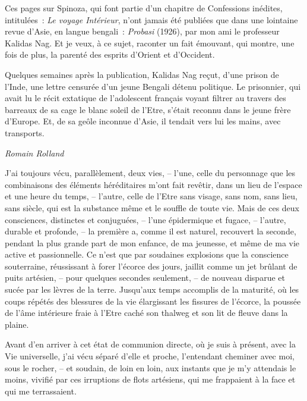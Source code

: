 

Ces pages sur Spinoza, qui font partie d'un chapitre de Confessions
inédites, intitulées~: \emph{Le voyage Intérieur}, n'ont jamais été
publiées que dans une lointaine revue d'Asie, en langue bengali~:
\emph{Probasi} (1926), par mon ami le professeur Kalidas Nag. Et je
veux, à ce sujet, raconter un fait émouvant, qui montre, une fois de
plus, la parenté des esprits d'Orient et d'Occident.

Quelques semaines après la publication, Kalidas Nag reçut, d'une prison
de l'Inde, une lettre censurée d'un jeune Bengali détenu politique. Le
prisonnier, qui avait lu le récit extatique de l'adolescent français
voyant filtrer au travers des barreaux de sa cage le blanc soleil de
l'Etre, s'était reconnu dans le jeune frère d'Europe. Et, de sa geôle
inconnue d'Asie, il tendait vers lui les mains, avec transports.

\begin{flushright}
\emph{Romain Rolland}
\end{flushright}

\pagebreak
\thispagestyle{empty}
\movetooddpage

J'ai toujours vécu, parallèlement, deux vies, -- l'une, celle du
personnage que les combinaisons des éléments héréditaires m'ont fait
revêtir, dans un lieu de l'espace et une heure du temps, -- l'autre,
celle de l'Etre sans visage, sans nom, sans lieu, sans siècle, qui est
la substance même et le souffle de toute vie. Mais de ces deux
consciences, distinctes et conjuguées, -- l'une épidermique et fugace,
-- l'autre, durable et profonde, -- la première a, comme il est naturel,
recouvert la seconde, pendant la plus grande part de mon enfance, de ma
jeunesse, et même de ma vie active et passionnelle. Ce n'est que par
soudaines explosions que la conscience souterraine, réussissant à forer
l'écorce des jours, jaillit comme un jet brûlant de puits artésien, --
pour quelques secondes seulement, -- de nouveau disparue et sucée par
les lèvres de la terre. Jusqu'aux temps accomplis de la maturité, où les
coups répétés des blessures de la vie élargissant les fissures de
l'écorce, la poussée de l'âme intérieure fraie à l'Etre caché son
thalweg et son lit de fleuve dans la plaine.

Avant d'en arriver à cet état de communion directe, où je suis à
présent, avec la Vie universelle, j'ai vécu séparé d'elle et proche,
l'entendant cheminer avec moi, sous le rocher, -- et soudain, de loin en
loin, aux instants que je m'y attendais le moins, vivifié par ces
irruptions de flots artésiens, qui me frappaient à la face et qui me
terrassaient.

